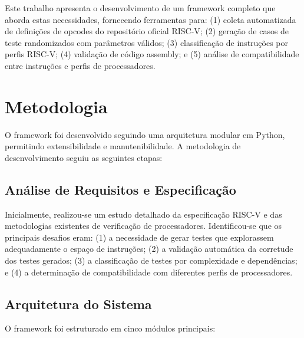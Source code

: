 \documentclass[12pt,a4paper]{article}
\begin{document}
Este trabalho apresenta o desenvolvimento de um framework completo que aborda estas necessidades, fornecendo ferramentas para: (1) coleta automatizada de definições de opcodes do repositório oficial RISC-V; (2) geração de casos de teste randomizados com parâmetros válidos; (3) classificação de instruções por perfis RISC-V; (4) validação de código assembly; e (5) análise de compatibilidade entre instruções e perfis de processadores.

\section{Metodologia}

O framework foi desenvolvido seguindo uma arquitetura modular em Python, permitindo extensibilidade e manutenibilidade. A metodologia de desenvolvimento seguiu as seguintes etapas:

\subsection{Análise de Requisitos e Especificação}

Inicialmente, realizou-se um estudo detalhado da especificação RISC-V e das metodologias existentes de verificação de processadores. Identificou-se que os principais desafios eram: (1) a necessidade de gerar testes que explorassem adequadamente o espaço de instruções; (2) a validação automática da corretude dos testes gerados; (3) a classificação de testes por complexidade e dependências; e (4) a determinação de compatibilidade com diferentes perfis de processadores.

\subsection{Arquitetura do Sistema}

O framework foi estruturado em cinco módulos principais:
\end{document}
